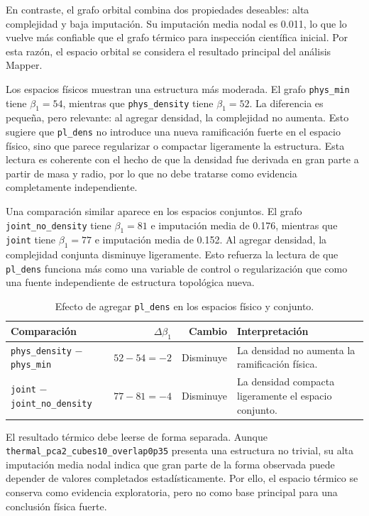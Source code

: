 En contraste, el grafo orbital combina dos propiedades deseables: alta complejidad y baja imputación. Su imputación media nodal es 0.011, lo que lo vuelve más confiable que el grafo térmico para inspección científica inicial. Por esta razón, el espacio orbital se considera el resultado principal del análisis Mapper.

Los espacios físicos muestran una estructura más moderada. El grafo \texttt{phys\_min} tiene $\beta_1=54$, mientras que \texttt{phys\_density} tiene $\beta_1=52$. La diferencia es pequeña, pero relevante: al agregar densidad, la complejidad no aumenta. Esto sugiere que \texttt{pl\_dens} no introduce una nueva ramificación fuerte en el espacio físico, sino que parece regularizar o compactar ligeramente la estructura. Esta lectura es coherente con el hecho de que la densidad fue derivada en gran parte a partir de masa y radio, por lo que no debe tratarse como evidencia completamente independiente.

Una comparación similar aparece en los espacios conjuntos. El grafo \texttt{joint\_no\_density} tiene $\beta_1=81$ e imputación media de 0.176, mientras que \texttt{joint} tiene $\beta_1=77$ e imputación media de 0.152. Al agregar densidad, la complejidad conjunta disminuye ligeramente. Esto refuerza la lectura de que \texttt{pl\_dens} funciona más como una variable de control o regularización que como una fuente independiente de estructura topológica nueva.

\begin{table}[H]
\centering
\small
\begin{tabular}{p{}rrp{}}
\toprule
\textbf{Comparación} & \textbf{$\Delta \beta_1$} & \textbf{Cambio} & \textbf{Interpretación} \\
\midrule
\texttt{phys\_density} $-$ \texttt{phys\_min} & $52-54=-2$ & Disminuye & La densidad no aumenta la ramificación física. \\
\texttt{joint} $-$ \texttt{joint\_no\_density} & $77-81=-4$ & Disminuye & La densidad compacta ligeramente el espacio conjunto. \\
\bottomrule
\end{tabular}
\caption{Efecto de agregar \texttt{pl\_dens} en los espacios físico y conjunto.}
\label{tab:density_effect_mapper}
\end{table}

El resultado térmico debe leerse de forma separada. Aunque \texttt{thermal\_pca2\_cubes10\_overlap0p35} presenta una estructura no trivial, su alta imputación media nodal indica que gran parte de la forma observada puede depender de valores completados estadísticamente. Por ello, el espacio térmico se conserva como evidencia exploratoria, pero no como base principal para una conclusión física fuerte.

